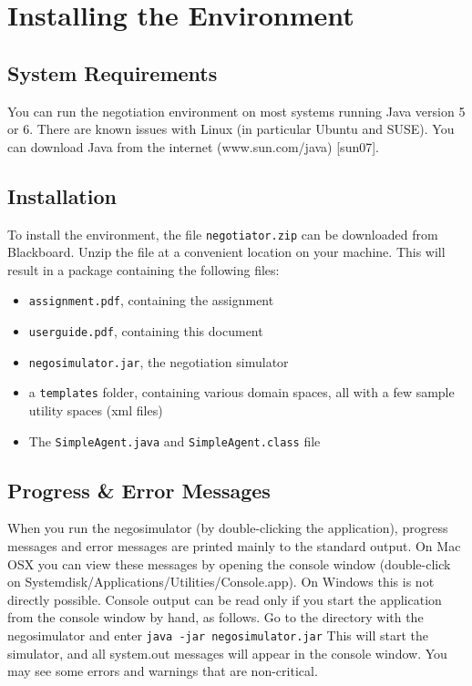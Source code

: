 \documentclass[]{article}
\begin{document}
\section{Installing the Environment}

\subsection{System Requirements}
You can run the negotiation environment on most systems running Java version 5 or 6. There are known issues with Linux (in particular Ubuntu and SUSE). You can download Java from the internet (www.sun.com/java) [sun07]. 

\subsection{Installation}
To install the environment, the file \texttt{negotiator.zip} can be downloaded from Blackboard. Unzip the file at a convenient location on your machine. This will result in a package containing the following files:

\begin{itemize}
	\item \texttt{assignment.pdf}, containing the assignment
	\item \texttt{userguide.pdf}, containing this document
	\item \texttt{negosimulator.jar}, the negotiation simulator
	\item a \texttt{templates} folder, containing various domain spaces, all with a few sample utility spaces (xml files)
	\item The \texttt{SimpleAgent.java} and \texttt{SimpleAgent.class} file
\end{itemize}

\subsection{Progress \& Error Messages}
When you run the negosimulator (by double-clicking the application), progress messages and error messages are printed mainly to the standard output. On Mac OSX you can view these messages by opening the console window (double-click on Systemdisk/Applications/Utilities/Console.app). On Windows this is not directly possible. Console output can be read only if you start the application from the console window by hand, as follows. Go to the directory with the negosimulator and enter
\texttt{java -jar negosimulator.jar}
This will start the simulator, and all system.out messages will appear in the console window. You may see some errors and warnings that are non-critical.
\end{document}

